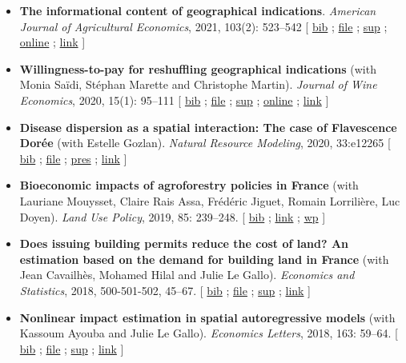 \documentclass[11pt, a4paper]{./style}
\begin{document}
\begin{itemize}
\item \textbf{The informational content of geographical
indications}. \emph{American Journal of Agricultural Economics}, 2021,
103(2): 523--542 [ \href{bib/GEOIND.bib}{bib} ; \href{doc/GEOIND-FILE.pdf}{file} ; \href{doc/GEOIND-SUP.pdf}{sup} ; \href{https://github.com/jsay/geoInd/}{online} ; \href{https://onlinelibrary.wiley.com/doi/full/10.1111/ajae.12100}{link} ]
\item \textbf{Willingness-to-pay for reshuffling geographical indications}
(with Monia Saïdi, Stéphan Marette and Christophe
Martin). \emph{Journal of Wine Economics}, 2020, 15(1): 95--111 [ \href{bib/RFGI.bib}{bib}
; \href{doc/RFGI-FILE.pdf}{file} ; \href{doc/RFGI-SUP.pdf}{sup} ; \href{https://github.com/jsay/reshufGI/}{online} ; \href{https://www.cambridge.org/core/journals/journal-of-wine-economics/article/abs/willingnesstopay-for-reshuffling-geographical-indications/FD4DB1BCA54C1E204773BF861965BEBD}{link} ]
\item \textbf{Disease dispersion as a spatial interaction: The case of
Flavescence Dorée} (with Estelle Gozlan). \emph{Natural Resource
Modeling}, 2020, 33:e12265 [ \href{bib/SPFD.bib}{bib} ; \href{doc/SPFD-FILE.pdf}{file} ; \href{doc/SPFD-PRES.pdf}{pres} ; \href{https://onlinelibrary.wiley.com/doi/full/10.1111/nrm.12265}{link} ]
\item \textbf{Bioeconomic impacts of agroforestry policies in France} (with
Lauriane Mouysset, Claire Rais Assa, Frédéric Jiguet, Romain
Lorrilière, Luc Doyen). \emph{Land Use Policy}, 2019, 85: 239--248.  [
\href{bib/BIOFOR.bib}{bib} ; \href{https://www.sciencedirect.com/science/article/abs/pii/S0264837718308160}{link} ;  \href{http://cahiersdugretha.u-bordeaux4.fr/2017/2017-05.pdf}{wp} ]
\item \textbf{Does issuing building permits reduce the cost of land? An
estimation based on the demand for building land in France} (with
Jean Cavailhès, Mohamed Hilal and Julie Le Gallo). \emph{Economics and
Statistics}, 2018, 500-501-502, 45--67.  [ \href{bib/PCPX.bib}{bib} ; \href{doc/PCPX-FILE.pdf}{file} ; \href{doc/PCPX-SUP.pdf}{sup} ;
\href{https://insee.fr/en/statistiques/3621981?sommaire=3622133}{link} ]
\item \textbf{Nonlinear impact estimation in spatial autoregressive models}
(with Kassoum Ayouba and Julie Le Gallo). \emph{Economics Letters},
2018, 163: 59--64. [ \href{bib/NLSP.bib}{bib} ; \href{doc/NLSP-FILE.pdf}{file} ; \href{doc/NLSP-SUP.pdf}{sup} ; \href{https://www.sciencedirect.com/science/article/pii/S0165176517304846}{link} ]

\end{itemize}
\end{document}
